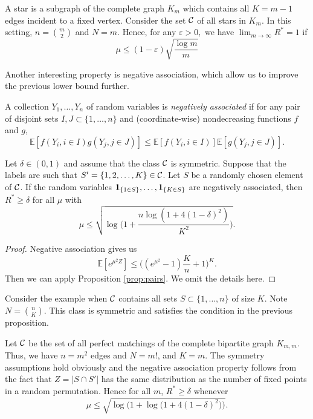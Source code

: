 \documentclass[10pt, oneside]{article}
\begin{document}
\begin{exmp}
A star is a subgraph of the complete graph $K_m$ which contains all $K=m-1$ edges incident to a fixed vertex. Consider the set ${\mathcal C}$ of all stars in $K_m$. In this setting, $n={m\choose2}$ and $N=m$. Hence, 
for any $\varepsilon>0,$ we have $\lim_{m\to\infty} R^* = 1$ if 
$$\mu\le(1-\varepsilon)\sqrt{\dfrac{\log m}{m}}$$
\end{exmp}
Another interesting property is negative association, which allow us to improve the previous lower bound further.
\begin{defn}
  A collection $Y_1,\ldots,Y_n$ of random variables is \textit{negatively associated} if for any pair of disjoint sets $I,J\subset\{1,\ldots,n\}$ and (coordinate-wise) nondecreasing functions $f$ and $g$,
\[
\mathbb{E}[ f(Y_i, i\in I) g(Y_j, j\in J) ]
\le\mathbb{E}[ f(Y_i, i\in I) ] \mathbb{E}[g(Y_j, j\in J) ].
\]
\end{defn}

\begin{prop}
  \label{negass}
  Let $\delta\in(0,1)$ and assume that the class ${\mathcal C}$ is symmetric. Suppose that the labels are such
  that $S'=\{1,2,\ldots,K\} \in{\mathcal C}$. Let $S$ be a randomly chosen
  element of ${\mathcal C}$.
  If the random variables
  ${\bf 1}_{\{ 1 \in S \}},\ldots,{\bf 1}_{\{ K\in S \}}$ are
  negatively associated,
  then
  $R^*\ge\delta$ for all $\mu$ with
  \[
  \mu\le\sqrt{\log\biggl(1+\frac{n\log(1+4(1-\delta)^2)}{K^2} \biggr)}.
  \]
\end{prop}
\begin{proof}
  Negative association gives us
  $$\mathbb{E}[ e^{\mu^2 Z}]\le \biggl( (e^{\mu^2} -1 ) \frac{K}{n} +1 \biggr)^K.$$
  Then we can apply Proposition \ref{prop:pairs}. We omit the details here.
\end{proof}
\begin{exmp}
  Consider the example when ${\mathcal C}$ contains all sets $S \subset\{1,\ldots ,n\}$ of size $K$. Note $N={n\choose K}$. This class is symmetric and satisfies the condition in the previous proposition.
\end{exmp}

\begin{exmp}
  \label{exmp:Perfect Matchings}
  Let ${\mathcal C}$ be the set of all perfect matchings of the complete bipartite graph $K_{m,m}$. Thus, we have $n=m^2$ edges and $N=m!$, and $K=m$.
  The symmetry assumptions hold obviously and the negative association property follows from the fact that $Z=|S\cap S'|$ has the same
distribution as the number of fixed points in a random permutation. Hence for all $m$, $R^* \ge\delta$ whenever
\[
\mu\le\sqrt{\log\bigl(1+\log\bigl(1+4(1-\delta)^2\bigr)\bigr)}.
\]
\end{exmp}
\end{document}
